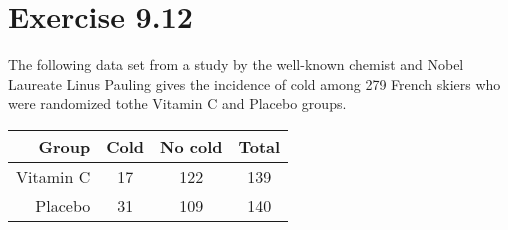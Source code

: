 \documentclass{article}
\begin{document}
\section*{Exercise 9.12}

The following data set from a study by the well-known chemist and Nobel Laureate Linus Pauling gives the incidence of cold among 279 French skiers who were randomized tothe Vitamin C and Placebo groups.

\begin{center}
	\begin{tabular}{|r|c|c|c|}
		\hline
		Group & Cold & No cold & Total\\
		\hline
		Vitamin C & 17 & 122 & 139 \\
		\hline
		Placebo & 31 & 109 & 140 \\
		\hline
	\end{tabular}
\end{center}
\end{document}
